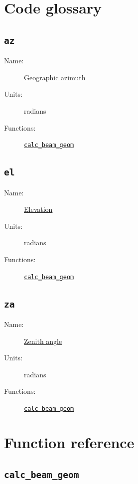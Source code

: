 \documentclass{book}
\begin{document}
\section{Code glossary}

\subsection{\texttt{az}}
\begin{description}
    \item[Name:] \hyperlink{sec:coordslocalsky}{Geographic azimuth}
    \item[Units:] radians
    \item[Functions:] \hyperlink{cn:calc_beam_geom}{\texttt{calc\_beam\_geom}}
\end{description}

\subsection{\texttt{el}}
\begin{description}
    \item[Name:] \hyperlink{sec:coordslocalsky}{Elevation}
    \item[Units:] radians
    \item[Functions:] \hyperlink{cn:calc_beam_geom}{\texttt{calc\_beam\_geom}}
\end{description}

\subsection{\texttt{za}}
\begin{description}
    \item[Name:] \hyperlink{sec:coordslocalsky}{Zenith angle}
    \item[Units:] radians
    \item[Functions:] \hyperlink{cn:calc_beam_geom}{\texttt{calc\_beam\_geom}}
\end{description}

\section{Function reference}

\subsection{\texttt{calc\_beam\_geom}}
\label{fcn:calc_beam_geom}
\end{document}
